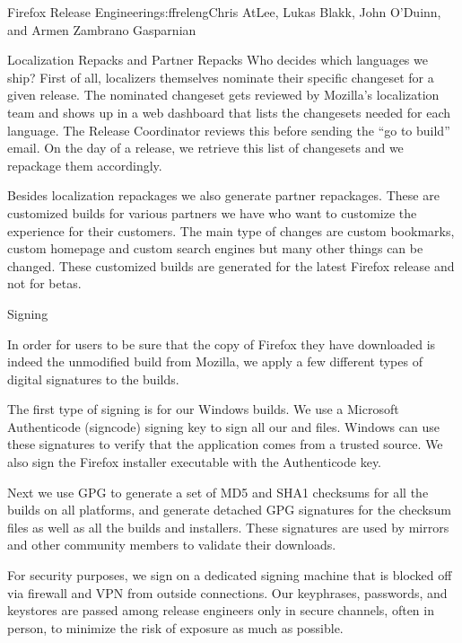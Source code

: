 \begin{aosachapter}{Firefox Release Engineering}{s:ffreleng}{Chris AtLee, Lukas Blakk, John O'Duinn, and Armen Zambrano Gasparnian}
\begin{aosasect1}{Localization Repacks and Partner Repacks}
Who decides which languages we ship? First of all, localizers
themselves nominate their specific changeset for a given release. The
nominated changeset gets reviewed by Mozilla's localization team and
shows up in a web dashboard that lists the changesets needed for each
language. The Release Coordinator reviews this before sending the ``go
to build'' email. On the day of a release, we retrieve this list of
changesets and we repackage them accordingly.

Besides localization repackages we also generate partner
repackages. These are customized builds for various partners we have
who want to customize the experience for their customers.  The main
type of changes are custom bookmarks, custom homepage and custom
search engines but many other things can be changed. These customized
builds are generated for the latest Firefox release and not for betas.

\end{aosasect1}

\begin{aosasect1}{Signing}

In order for users to be sure that the copy of Firefox they have
downloaded is indeed the unmodified build from Mozilla, we apply a few different
types of digital signatures to the builds.

The first type of signing is for our Windows builds. We use a
Microsoft Authenticode (signcode) signing key to sign all our
 and  files. Windows can use these signatures to
verify that the application comes from a trusted source. We also sign
the Firefox installer executable with the Authenticode key. 

Next we use GPG to generate a set of MD5 and SHA1 checksums for
all the builds on all platforms, and generate detached GPG
signatures for the checksum files as well as all the builds and installers.
These signatures are used by mirrors and other community members
to validate their downloads.

For security purposes, we sign on a dedicated signing machine that is
blocked off via firewall and VPN from outside connections. Our
keyphrases, passwords, and keystores are passed among release
engineers only in secure channels, often in person, to minimize the
risk of exposure as much as possible.



\end{aosasect1}
\end{aosachapter}
